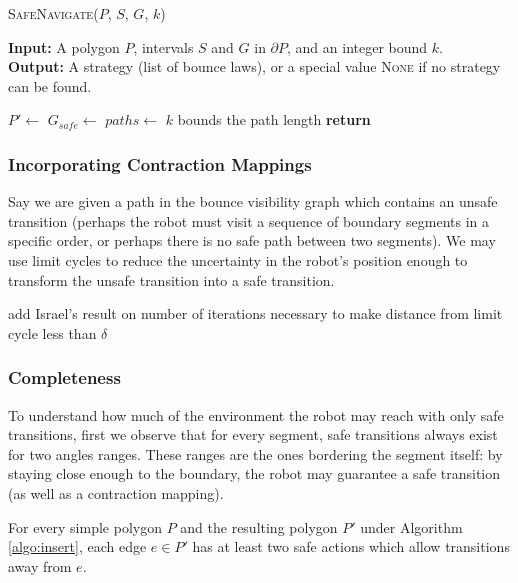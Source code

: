 \documentclass[]{styles/svproc}  %
\begin{document}
\begin{algorithm}
\caption{\textsc{SafeNavigate}($P$, $S$, $G$, $k$)}
\label{algo:nav}
\hspace*{\algorithmicindent} \textbf{Input:} A polygon $P$, intervals $S$ and
$G$ in $\partial P$, and an integer bound $k$.\\
\hspace*{\algorithmicindent} \textbf{Output:} A strategy (list of bounce laws),
or a special value \textsc{None} if no strategy can be found.
\begin{algorithmic}[1]
\State $P' \gets$ 
\State $G_{safe} \gets$ 
\State $paths \gets$ 
\Comment $k$ bounds the path length
\State \textbf{return} 
\end{algorithmic}
\end{algorithm}


\subsubsection{Incorporating Contraction Mappings}

Say we are given a path in the bounce visibility graph which contains an unsafe
transition (perhaps the robot must visit a sequence of boundary segments in a
specific order, or perhaps there is no safe path between two segments). We may
use limit cycles to reduce the uncertainty in the robot's position enough to
transform the unsafe transition into a safe transition.

{\color{red} add Israel's result on number of iterations necessary to make distance from
limit cycle less than $\delta$}

\subsubsection{Completeness}

To understand how much of the environment the robot may reach with only safe
transitions, first we observe that for every segment, safe transitions always exist
for two angles ranges. These ranges are the ones bordering the segment itself:
by staying close enough to the boundary, the robot may guarantee a safe
transition (as well as a contraction mapping).

\begin{proposition} \label{prop:twosafe}
For every simple polygon $P$ and the resulting polygon $P'$ under Algorithm
\ref{algo:insert}, each edge $e \in P'$ has at least two safe actions which allow
transitions away from $e$.
\end{proposition}
\end{document}
